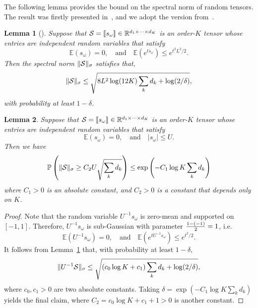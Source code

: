 \documentclass[11pt]{article}
\theoremstyle{plain}
\newtheorem{lem}{Lemma}
\theoremstyle{definition}
\begin{document}
The following lemma provides the bound on the spectral norm of random tensors. The result was firstly presented in~\cite{nguyen2015tensor}, and we adopt the version from~\cite{tomioka2014spectral}.
\begin{lem}[\cite{tomioka2014spectral}]\label{lem:tensor}
Suppose that $\mathcal{S}=\llbracket s_{\omega} \rrbracket\in\mathbb{R}^{d_1\times \cdots \times d_K}$ is an order-$K$ tensor whose entries are independent random variables that satisfy
\[
\mathbb{E}(s_{\omega})=0,\quad \text{and} \quad\mathbb{E}(e^{ts_{\omega}})\leq e^{t^2L^2/2}.
\]
Then the spectral norm $\lVert\mathcal{S}\rVert_\sigma$ satisfies that,
\[
\lVert\mathcal{S}\rVert_\sigma\leq \sqrt{{8L^2} \log (12K) \sum_k d_k +\log (2/\delta)},
\]
with probability at least $1-\delta$.
\end{lem}



\begin{lem} \label{lem:noisytensor}
Suppose that $\mathcal{S}=\llbracket s_{\omega} \rrbracket\in\mathbb{R}^{d_1\times \cdots \times d_K}$ is an order-$K$ tensor whose entries are independent random variables that satisfy
\[
\mathbb{E}(s_{\omega})=0,\quad \text{and}\quad |s_{\omega}|\leq U.
\]
Then we have
\[
\mathbb{P}\left(\lVert\mathcal{S}\rVert_\sigma\geq C_2 U\sqrt{\sum_k d_k} \right)\leq \exp\left(-C_1  \log K \sum_k d_k\right)
\]
where $C_1>0$ is an absolute constant, and $C_2>0$ is a constant that depends only on $K$.
\end{lem}

\begin{proof}  Note that the random variable $U^{-1}s_{\omega}$ is zero-mean and supported on $[-1,1]$. Therefore, $U^{-1}s_{\omega}$ is sub-Gaussian with parameter ${1-(-1)\over 2}=1$, i.e.
\[
\mathbb{E}(U^{-1}s_{\omega})=0,\quad \text{and}\quad \mathbb{E}(e^{tU^{-1}s_{\omega}})\leq e^{t^2/2}.
\]
It follows from Lemma~\ref{lem:tensor} that, with probability at least $1-\delta$,
\[
\lVert U^{-1}\mathcal{S}\rVert_\sigma\leq \sqrt{\left(c_0\log K+c_1\right) \sum_k d_k +\log (2/\delta)},
\]
where $c_0, c_1>0$ are two absolute constants. Taking $\delta=\exp (-C_1\log K \sum_k d_k)$ yields the final claim, where $C_2=c_0\log K+c_1+1>0$ is another constant.
\end{proof}
\end{document}
